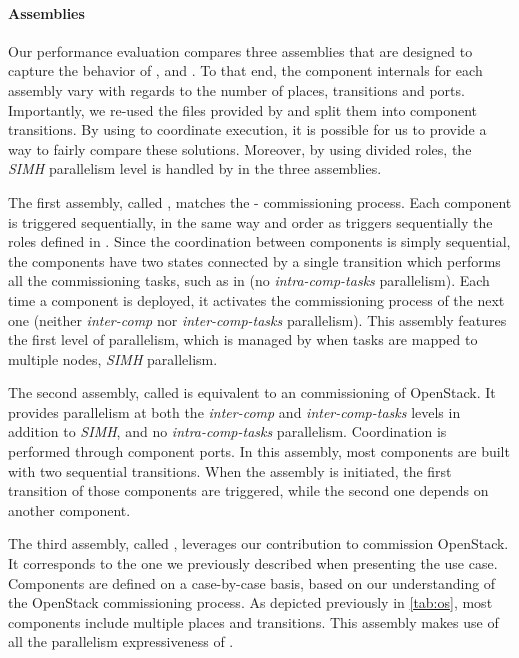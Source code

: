 \paragraph{Assemblies}
Our performance evaluation compares three assemblies that
are designed to capture the behavior of \ansible, \aeolus and \mad. To
that end, the component internals for each assembly vary with regards
to the number of places, transitions and ports. Importantly, we re-used
the \ansible files provided by
\kolla and split them into component transitions. By using \mad to
coordinate \ansible execution, it is possible for us to provide a way
to fairly compare these solutions. Moreover, by using divided \kolla
roles, the \emph{SIMH} parallelism level is handled by \ansible in the
three assemblies.

The first assembly, called \ansass, matches the \kolla-\ansible
commissioning process. Each component is triggered sequentially, in
the same way and order as \ansible triggers sequentially the roles
defined in \kolla. Since the coordination
between components is simply sequential, the components have two states
connected by a single transition which performs all the commissioning
tasks, such as in \kolla (\ie no \emph{intra-comp-tasks}
parallelism). Each time a component is deployed, it activates the
commissioning process of the next one (\ie neither \emph{inter-comp}
nor \emph{inter-comp-tasks} parallelism). This assembly features the
first level of parallelism, which is managed by \ansible when tasks are
mapped to multiple nodes, \ie \emph{SIMH} parallelism.
%

The second assembly, called \aeoass is equivalent to an \aeolus
commissioning of OpenStack. It provides parallelism at both the
\emph{inter-comp} and \emph{inter-comp-tasks} levels in addition to
\emph{SIMH}, and no \emph{intra-comp-tasks} parallelism. Coordination
is performed through component ports. In this assembly, most components are
built with two sequential transitions. When the assembly is
initiated, the first transition of those components are triggered,
while the second one depends on another
component.
%

The third assembly, called \madass, leverages our contribution to
commission OpenStack. It corresponds to the one we previously
described when presenting the use case. Components are defined on a
case-by-case basis, based on our understanding of the OpenStack
commissioning process. As depicted previously in \cref{tab:os}, most
components include multiple places and transitions. This assembly
makes use of all the parallelism expressiveness of \mad.

